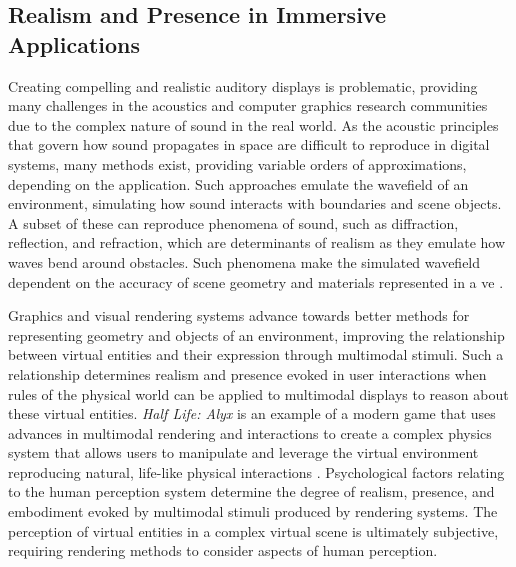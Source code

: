 \subsection{Realism and Presence in Immersive Applications}
Creating compelling and realistic auditory displays is problematic, providing many challenges in the acoustics and computer graphics research communities due to the complex nature of sound in the real world. As the acoustic principles that govern how sound propagates in space are difficult to reproduce in digital systems, many methods exist, providing variable orders of approximations, depending on the application. Such approaches emulate the wavefield of an environment, simulating how sound interacts with boundaries and scene objects. A subset of these can reproduce phenomena of sound, such as diffraction, reflection, and refraction, which are determinants of realism as they emulate how waves bend around obstacles. Such phenomena make the simulated wavefield dependent on the accuracy of scene geometry and materials represented in a \acrshort{ve} \citep{kuttruff2016room}.\par
Graphics and visual rendering systems advance towards better methods for representing geometry and objects of an environment, improving the relationship between virtual entities and their expression through multimodal stimuli. Such a relationship determines realism and presence evoked in user interactions when rules of the physical world can be applied to multimodal displays to reason about these virtual entities. \textit{Half Life: Alyx} is an example of a modern game that uses advances in multimodal rendering and interactions to create a complex physics system that allows users to manipulate and leverage the virtual environment reproducing natural, life-like physical interactions \citep{bollmer2022embodied}.
Psychological factors relating to the human perception system determine the degree of realism, presence, and embodiment evoked by multimodal stimuli produced by rendering systems. The perception of virtual entities in a complex virtual scene is ultimately subjective, requiring rendering methods to consider aspects of human perception.

